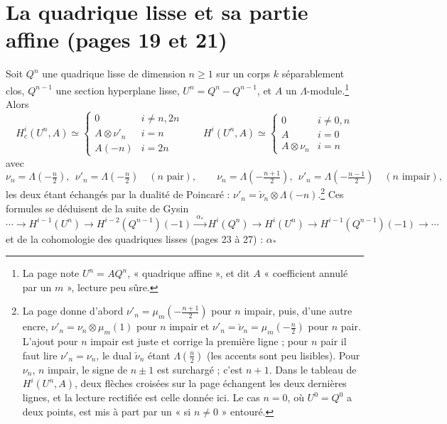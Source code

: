 \documentclass[11pt,a4paper]{article}
\begin{document}
\section*{La quadrique lisse et sa partie affine (pages 19 et 21)}

Soit $Q^{n}$ une quadrique lisse de dimension $n \geq 1$ sur un corps $k$
séparablement clos, $Q^{n-1}$ une section hyperplane lisse,
$U^{n} = Q^{n} - Q^{n-1}$, et $A$ un $\Lambda$-module.\footnote{La page note
$U^{n} = AQ^{n}$, « quadrique affine », et dit $A$ « coefficient annulé
par un $m$ », lecture peu sûre.} Alors
\[
  H^{i}_{c}(U^{n}, A) \simeq
  \left\{
  \begin{array}{ll}
    0 & i \neq n, 2n \\
    A \otimes \nu'_{n} & i = n \\
    A(-n) & i = 2n
  \end{array}
  \right.
  \qquad
  H^{i}(U^{n}, A) \simeq
  \left\{
  \begin{array}{ll}
    0 & i \neq 0, n \\
    A & i = 0 \\
    A \otimes \nu_{n} & i = n
  \end{array}
  \right.
\]
avec
\[
  \nu_{n} = \Lambda(-\tfrac{n}{2}), \ \ \nu'_{n} = \Lambda(-\tfrac{n}{2}) \quad (n \text{ pair}),
  \qquad
  \nu_{n} = \Lambda(-\tfrac{n+1}{2}), \ \ \nu'_{n} = \Lambda(-\tfrac{n-1}{2}) \quad (n \text{ impair}),
\]
les deux étant échangés par la dualité de Poincaré :
$\nu'_{n} = \check\nu_{n} \otimes \Lambda(-n)$.\footnote{La page donne
d'abord $\nu'_{n} = \mu_{m}(-\tfrac{n+1}{2})$ pour $n$ impair, puis, d'une
autre encre, $\nu'_{n} = \nu_{n} \otimes \mu_{m}(1)$ pour $n$ impair et
$\nu'_{n} = \check\nu_{n} = \mu_{m}(-\tfrac{n}{2})$ pour $n$ pair. L'ajout
pour $n$ impair est juste et corrige la première ligne ; pour $n$ pair il
faut lire $\nu'_{n} = \nu_{n}$, le dual $\check\nu_{n}$ étant
$\Lambda(\tfrac{n}{2})$ (les accents sont peu lisibles). Pour $\nu_{n}$, $n$
impair, le signe de $n \pm 1$ est surchargé ; c'est $n + 1$. Dans le
tableau de $H^{i}(U^{n}, A)$, deux flèches croisées sur la page échangent
les deux dernières lignes, et la lecture rectifiée est celle donnée ici. Le
cas $n = 0$, où $U^{0} = Q^{0}$ a deux points, est mis à part par un
« si $n \neq 0$ » entouré.} Ces formules se déduisent de la suite de
Gysin
\[
  \cdots \to H^{i-1}(U^{n}) \to H^{i-2}(Q^{n-1})(-1) \xrightarrow{\ \alpha_{*}\ }
  H^{i}(Q^{n}) \to H^{i}(U^{n}) \to H^{i-1}(Q^{n-1})(-1) \to \cdots
\]
et de la cohomologie des quadriques lisses (pages 23 à 27) : $\alpha_{*}$
\end{document}
